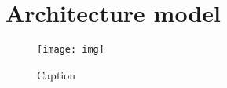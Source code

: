 \newpage
\section{Architecture model}

\begin{figure}
    \centering
    \texttt{[image: img]}
    \caption{Caption}
    \label{fig:my_label}
\end{figure}
